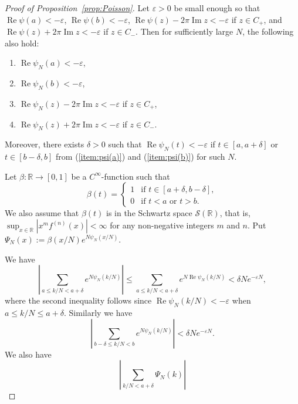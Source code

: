 \documentclass[a4paper,dvipdfmx]{amsart}
\theoremstyle{plain}
\theoremstyle{definition}
\theoremstyle{remark}
\newcommand{\R}{\mathbb{R}}
\renewcommand{\Re}{\operatorname{Re}}
\renewcommand{\Im}{\operatorname{Im}}
\renewcommand{\theenumi}{\roman{enumi}}
\numberwithin{equation}{section}
\begin{document}
\begin{proof}[Proof of Proposition~\ref{prop:Poisson}]
Let $\varepsilon>0$ be small enough so that $\Re{\psi(a)}<-\varepsilon$,
$\Re{\psi(b)}<-\varepsilon$, $\Re{\psi(z)}-2\pi\Im{z}<-\varepsilon$ if $z\in C_{+}$, and $\Re{\psi(z)}+2\pi\Im{z}<-\varepsilon$ if $z\in C_{-}$.
Then for sufficiently large $N$, the following also hold:
\renewcommand{\theenumi}{\roman{enumi}}
\begin{enumerate}
\item\label{item:psi(a)}
$\Re{\psi_N(a)}<-\varepsilon$,
\item\label{item:psi(b)}
$\Re{\psi_N(b)}<-\varepsilon$,
\item\label{item:C+}
$\Re{\psi_N(z)}-2\pi\Im{z}<-\varepsilon$ if $z\in C_{+}$,
\item\label{item:C-}
$\Re{\psi_N(z)}+2\pi\Im{z}<-\varepsilon$ if $z\in C_{-}$.
\end{enumerate}
Moreover, there exists $\delta>0$ such that $\Re{\psi_N(t)}<-\varepsilon$ if $t\in[a,a+\delta]$ or $t\in[b-\delta,b]$ from (\ref{item:psi(a)}) and (\ref{item:psi(b)}) for such $N$.
\par
Let $\beta\colon\R\to[0,1]$ be a $C^{\infty}$-function such that
\begin{equation*}
  \beta(t)
  =
  \begin{cases}
    1&\text{if $t\in[a+\delta,b-\delta]$},
    \\
    0&\text{if $t<a$ or $t>b$}.
  \end{cases}
\end{equation*}
We also assume that $\beta(t)$ is in the Schwartz space $\mathcal{S}(\R)$, that is, $\sup_{x\in\R}\left|x^{m}f^{(n)}(x)\right|<\infty$ for any non-negative integers $m$ and $n$.
Put $\Psi_N(x):=\beta(x/N)e^{N\psi_N(x/N)}$.
\par
We have
\begin{equation}\label{eq:a_delta_f}
  \left|\sum_{a\le k/N<a+\delta}e^{N\psi_N(k/N)}\right|
  \le
  \sum_{a\le k/N<a+\delta}e^{N\Re{\psi_N(k/N)}}
  <
  \delta Ne^{-\varepsilon N},
\end{equation}
where the second inequality follows since $\Re{\psi_N(k/N)}<-\varepsilon$ when $a\le k/N\le a+\delta$.
Similarly we have
\begin{equation}\label{eq:b_delta_f}
  \left|\sum_{b-\delta\le k/N<b}e^{N\psi_N(k/N)}\right|
  <
  \delta Ne^{-\varepsilon N}.
\end{equation}
We also have
\begin{equation}\label{eq:a_delta_F}
  \left|\sum_{k/N<a+\delta}\Psi_N(k)\right|

\end{equation}
\end{proof}
\end{document}

